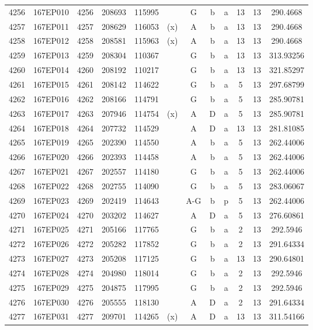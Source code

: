 \begin{tabular}{|*{12}{c|}}
4256 & 167EP010 & 4256 & 208693 & 115995 &  & G & b & a & 13 & 13 & 290.4668 \\ 
4257 & 167EP011 & 4257 & 208629 & 116053 & (x) & A & b & a & 13 & 13 & 290.4668 \\ 
4258 & 167EP012 & 4258 & 208581 & 115963 & (x) & A & b & a & 13 & 13 & 290.4668 \\ 
4259 & 167EP013 & 4259 & 208304 & 110367 &  & G & b & a & 13 & 13 & 313.93256 \\ 
4260 & 167EP014 & 4260 & 208192 & 110217 &  & G & b & a & 13 & 13 & 321.85297 \\ 
4261 & 167EP015 & 4261 & 208142 & 114622 &  & G & b & a & 5 & 13 & 297.68799 \\ 
4262 & 167EP016 & 4262 & 208166 & 114791 &  & G & b & a & 5 & 13 & 285.90781 \\ 
4263 & 167EP017 & 4263 & 207946 & 114754 & (x) & A & D & a & 5 & 13 & 285.90781 \\ 
4264 & 167EP018 & 4264 & 207732 & 114529 &  & A & D & a & 13 & 13 & 281.81085 \\ 
4265 & 167EP019 & 4265 & 202390 & 114550 &  & A & b & a & 5 & 13 & 262.44006 \\ 
4266 & 167EP020 & 4266 & 202393 & 114458 &  & A & b & a & 5 & 13 & 262.44006 \\ 
4267 & 167EP021 & 4267 & 202557 & 114180 &  & G & b & a & 5 & 13 & 262.44006 \\ 
4268 & 167EP022 & 4268 & 202755 & 114090 &  & G & b & a & 5 & 13 & 283.06067 \\ 
4269 & 167EP023 & 4269 & 202419 & 114643 &  & A-G & b & p & 5 & 13 & 262.44006 \\ 
4270 & 167EP024 & 4270 & 203202 & 114627 &  & A & D & a & 5 & 13 & 276.60861 \\ 
4271 & 167EP025 & 4271 & 205166 & 117765 &  & G & b & a & 2 & 13 & 292.5946 \\ 
4272 & 167EP026 & 4272 & 205282 & 117852 &  & G & b & a & 2 & 13 & 291.64334 \\ 
4273 & 167EP027 & 4273 & 205208 & 117125 &  & G & b & a & 13 & 13 & 290.64801 \\ 
4274 & 167EP028 & 4274 & 204980 & 118014 &  & G & b & a & 2 & 13 & 292.5946 \\ 
4275 & 167EP029 & 4275 & 204875 & 117995 &  & G & b & a & 2 & 13 & 292.5946 \\ 
4276 & 167EP030 & 4276 & 205555 & 118130 &  & A & D & a & 2 & 13 & 291.64334 \\ 
4277 & 167EP031 & 4277 & 209701 & 114265 & (x) & A & D & a & 13 & 13 & 311.54166 \\ 

\end{tabular}
